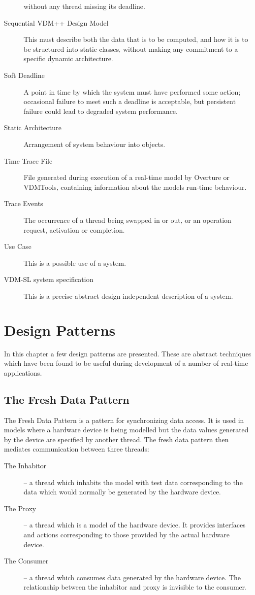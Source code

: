 \documentclass{overturerepchap}
\newcommand{\vdmtools}{VDMTools}
\begin{document}
\begin{description}
without any thread missing its deadline.
\item[Sequential VDM++ Design Model] This must describe both the data
that is to be computed, and how it is to be structured into static
classes, without making any commitment to a specific dynamic
architecture.
\item[Soft Deadline] A point in time by which the system must have
performed some action; occasional failure to meet such a deadline is
acceptable, but persistent failure could lead to degraded system
performance.
\item[Static Architecture] Arrangement of system behaviour into objects.
\item[Time Trace File] File generated during execution of a real-time
model by Overture or \vdmtools, containing information about the models
run-time behaviour.
\item[Trace Events] The occurrence of a thread being swapped in or
out, or an operation request, activation or completion.
\item[Use Case] This is a possible use of a system.
\item[VDM-SL system specification] This is a precise abstract design
independent description of a system.
\end{description}


\chapter{Design Patterns}\label{app:patterns}

In this chapter a few design patterns are presented. These are abstract
techniques which have been found to be useful during development of a
number of real-time applications.

\section{The Fresh Data Pattern}

The Fresh Data Pattern is a pattern for synchronizing data access. It
is used in models where a hardware device is being modelled but the
data values generated by the device are specified by another
thread. The fresh data pattern then mediates communication between
three threads:

\begin{description}
\item[The Inhabitor] -- a thread which inhabits the model with test
data corresponding to the data which would normally be generated by
the hardware device.
\item[The Proxy] -- a thread which is a model of the hardware
device. It provides interfaces and actions corresponding to those
provided by the actual hardware device.
\item[The Consumer] -- a thread which consumes data generated by the
hardware device.  The relationship between the inhabitor and proxy is
invisible to the consumer.
\end{description}
\end{document}
